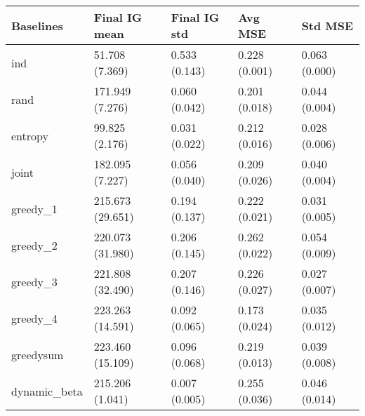 \begin{tabular}{lllll}
\toprule
    Baselines &     Final IG mean &   Final IG std &        Avg MSE &        Std MSE \\
\midrule
          ind &    51.708 (7.369) &  0.533 (0.143) &  0.228 (0.001) &  0.063 (0.000) \\
         rand &   171.949 (7.276) &  0.060 (0.042) &  0.201 (0.018) &  0.044 (0.004) \\
      entropy &    99.825 (2.176) &  0.031 (0.022) &  0.212 (0.016) &  0.028 (0.006) \\
        joint &   182.095 (7.227) &  0.056 (0.040) &  0.209 (0.026) &  0.040 (0.004) \\
     greedy\_1 &  215.673 (29.651) &  0.194 (0.137) &  0.222 (0.021) &  0.031 (0.005) \\
     greedy\_2 &  220.073 (31.980) &  0.206 (0.145) &  0.262 (0.022) &  0.054 (0.009) \\
     greedy\_3 &  221.808 (32.490) &  0.207 (0.146) &  0.226 (0.027) &  0.027 (0.007) \\
     greedy\_4 &  223.263 (14.591) &  0.092 (0.065) &  0.173 (0.024) &  0.035 (0.012) \\
    greedysum &  223.460 (15.109) &  0.096 (0.068) &  0.219 (0.013) &  0.039 (0.008) \\
 dynamic\_beta &   215.206 (1.041) &  0.007 (0.005) &  0.255 (0.036) &  0.046 (0.014) \\
\bottomrule
\end{tabular}
